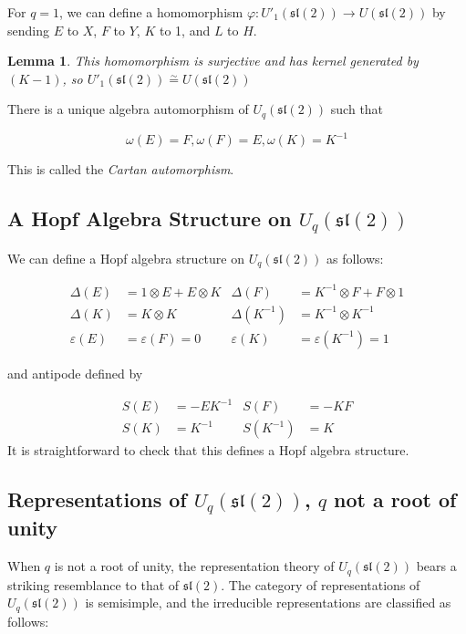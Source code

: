 \documentclass[]{article}
\newtheorem{lemma}[theorem]{Lemma}
\newcommand{\sll}{\mathfrak{sl}}
\numberwithin{equation}{subsection}
\begin{document}
For $q=1$, we can define a homomorphism $\varphi: U'_1(\sll(2)) \to
U(\sll(2))$ by sending $E$ to $X$, $F$ to $Y$, $K$ to 1, and $L$ to $H$. 
\begin{lemma}
This homomorphism is surjective and has kernel generated by $(K-1)$, so
$U'_1(\sll(2)) \stackrel{\sim}{=} U(\sll(2))$
\end{lemma}
There is a unique algebra automorphism of $U_q(\sll(2))$ such that 

\begin{equation}
    \omega(E) = F, \omega(F) = E, \omega(K) = K^{-1}
\end{equation}

This is called the \emph{Cartan automorphism}.

\subsection{A Hopf Algebra Structure on $U_q(\sll(2))$}
We can define a Hopf algebra structure on $U_q(\sll(2))$ as follows:

\begin{align}
    \Delta(E) &= 1 \otimes E + E \otimes K &  \Delta(F) &= K^{-1} \otimes F + F \otimes 1 \\
    \Delta(K) &= K \otimes K &  \Delta(K^{-1}) &= K^{-1} \otimes K^{-1}\\ 
    \varepsilon(E) &= \varepsilon(F) = 0 &  \varepsilon(K) &= \varepsilon(K^{-1}) = 1
\end{align}

and antipode defined by 

\begin{align}
    S(E) &= -EK^{-1} & S(F)      &= -KF \\
    S(K) &= K^{-1}   & S(K^{-1}) &= K 
\end{align}
It is straightforward to check that this defines a Hopf algebra structure. 

\subsection{Representations of $U_q(\sll(2))$, $q$ not a root of unity}

When $q$ is not a root of unity, the representation theory of $U_q(\sll(2))$ bears a striking resemblance to that of $\sll(2)$. The category of representations of $U_q(\sll(2))$ is semisimple, and  the irreducible representations are classified as follows:
\end{document}
